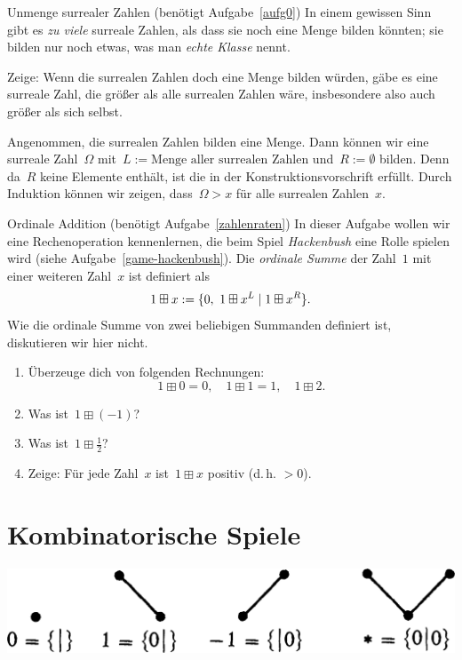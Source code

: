 \documentclass{zirkelblatt}
\newcommand{\head}[1]{\section*{\rmfamily #1}}%
\begin{document}
\begin{aufgabe}{Unmenge surrealer Zahlen (benötigt Aufgabe~\ref{aufg0})}
\label{unmenge}
In einem gewissen Sinn gibt es \emph{zu viele} surreale Zahlen, als dass sie
noch eine Menge bilden könnten; sie bilden nur noch etwas, was man \emph{echte
Klasse} nennt.

Zeige: Wenn die surrealen Zahlen doch eine Menge bilden würden, gäbe es eine
surreale Zahl, die größer als alle surrealen Zahlen wäre, insbesondere also auch
größer als sich selbst.
\end{aufgabe}
\begin{loesung}
Angenommen, die surrealen Zahlen bilden eine Menge. Dann können wir eine surreale
Zahl~$\Omega$ mit~$L := \text{Menge aller surrealen Zahlen}$ und~$R :=
\emptyset$ bilden. Denn da~$R$ keine Elemente enthält, ist die
 in der Konstruktionsvorschrift erfüllt. Durch Induktion
können wir zeigen, dass~$\Omega > x$ für alle surrealen Zahlen~$x$.
\end{loesung}

\begin{aufgabe}{Ordinale Addition (benötigt Aufgabe~\ref{zahlenraten})}
In dieser Aufgabe wollen wir eine Rechenoperation
kennenlernen, die beim Spiel \emph{Hackenbush} eine Rolle spielen wird (siehe
Aufgabe~\ref{game-hackenbush}). Die \emph{ordinale Summe} der Zahl~$1$ mit
einer weiteren Zahl~$x$ ist definiert als
\[ 1 \boxplus x := \sur{0,\ 1 \boxplus x^L}{1 \boxplus x^R}. \]
Wie die ordinale Summe von zwei beliebigen Summanden definiert ist,
diskutieren wir hier nicht.
\begin{enumerate}
\item Überzeuge dich von folgenden Rechnungen:
\[ 1 \boxplus 0 = 0, \quad
  1 \boxplus 1 = 1, \quad
  1 \boxplus 2. \]
\item Was ist~$1 \boxplus (-1)$?
\item Was ist~$1 \boxplus \tfrac{1}{2}$?
\item Zeige: Für jede Zahl~$x$ ist~$1 \boxplus x$ positiv (d.\,h. $> 0$).
\end{enumerate}
\end{aufgabe}


\newpage
\head{Kombinatorische Spiele}

\begin{center}\includegraphics[scale=0.2]{einfache-spiele}\end{center}
\end{document}
